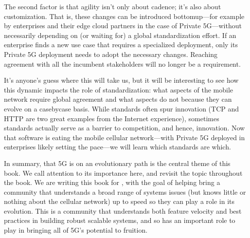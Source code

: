 \documentclass[a4paper,11pt,english]{sphinxmanual}
\begin{document}
\sphinxAtStartPar
The second factor is that agility isn’t only about cadence; it’s also
about customization. That is, these changes can be introduced
bottom\sphinxhyphen{}up—for example by enterprises and their edge cloud partners in
the case of Private 5G—without necessarily depending on (or waiting
for) a global standardization effort. If an enterprise finds a new
use case that requires a specialized deployment, only its Private 5G
deployment needs to adopt the necessary changes. Reaching agreement
with all the incumbent stakeholders will no longer be a requirement.

\sphinxAtStartPar
It’s anyone’s guess where this will take us, but it will be
interesting to see how this dynamic impacts the role of
standardization: what aspects of the mobile network require global
agreement and what aspects do not because they can evolve on a
case\sphinxhyphen{}by\sphinxhyphen{}case basis. While standards often spur innovation (TCP and
HTTP are two great examples from the Internet experience), sometimes
standards actually serve as a barrier to competition, and hence,
innovation. Now that software is eating the mobile cellular
network—with Private 5G deployed in enterprises likely setting the
pace—we will learn which standards are which.

\sphinxAtStartPar
In summary, that 5G is on an evolutionary path is the central theme of
this book. We call attention to its importance here, and revisit the
topic throughout the book. We are writing this book for , with the goal of helping bring a community that
understands a broad range of systems issues (but knows little or
nothing about the cellular network) up to speed so they can play a
role in its evolution. This is a community that understands both
feature velocity and best practices in building robust scalable
systems, and so has an important role to play in bringing all of 5G’s
potential to fruition.
\end{document}
